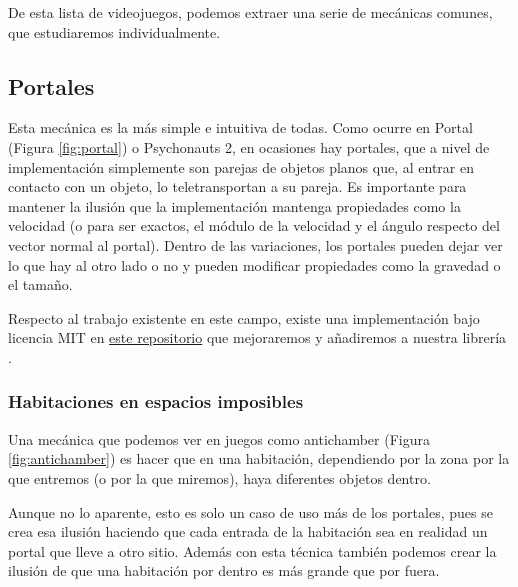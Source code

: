 De esta lista de videojuegos, podemos extraer una serie de mecánicas comunes, que estudiaremos individualmente.

\subsection{Portales}
\label{subsec:estadoDeLaCuestion/Mecanicas/Portales}
Esta mecánica es la más simple e intuitiva de todas. Como ocurre en Portal (Figura \ref{fig:portal}) o Psychonauts 2, en ocasiones hay portales, que a nivel de implementación simplemente son parejas de objetos planos que, al entrar en contacto con un objeto, lo teletransportan a su pareja. Es importante para mantener la ilusión que la implementación mantenga propiedades como la velocidad (o para ser exactos, el módulo de la velocidad y el ángulo respecto del vector normal al portal). Dentro de las variaciones, los portales pueden dejar ver lo que hay al otro lado o no y pueden modificar propiedades como la gravedad o el tamaño.

Respecto al trabajo existente en este campo, existe una implementación bajo licencia MIT en \href{https://github.com/codand/Unity3DPortals/}{este repositorio} que mejoraremos y añadiremos a nuestra librería .



\subsubsection{Habitaciones en espacios imposibles}
Una mecánica que podemos ver en juegos como antichamber (Figura \ref{fig:antichamber}) es hacer que en una habitación, dependiendo por la zona por la que entremos (o por la que miremos), haya diferentes objetos dentro.

Aunque no lo aparente, esto es solo un caso de uso más de los portales, pues se crea esa ilusión haciendo que cada entrada de la habitación sea en realidad un portal que lleve a otro sitio. Además con esta técnica también podemos crear la ilusión de que una habitación por dentro es más grande que por fuera.


